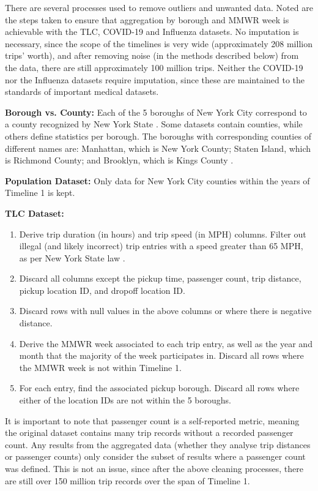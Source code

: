 \documentclass[11pt]{article}
\begin{document}
There are several processes used to remove outliers and unwanted data.
Noted are the steps taken to ensure that aggregation by borough and MMWR week is achievable with the TLC, COVID-19 and Influenza datasets.
No imputation is necessary, since the scope of the timelines is very wide (approximately 208 million trips' worth), 
and after removing noise (in the methods described below) from the data, there are still approximately 100 million trips.
Neither the COVID-19 nor the Influenza datasets require imputation, 
since these are maintained to the standards of important medical datasets.

\textbf{Borough vs. County:} Each of the 5 boroughs of New York City correspond to a county recognized by New York State \cite{countytoborough}.
Some datasets contain counties, while others define statistics per borough. The boroughs with corresponding counties of different names are: 
Manhattan, which is New York County; 
Staten Island, which is Richmond County;
and Brooklyn, which is Kings County \cite{countytoborough}.

\textbf{Population Dataset:}
Only data for New York City counties within the years of Timeline 1 is kept.

\textbf{TLC Dataset:}
\begin{multicols}{2}
    \begin{enumerate}
        \item Derive trip duration (in hours) and trip speed (in MPH) columns. 
        Filter out illegal (and likely incorrect) trip entries with a speed greater than 65 MPH, 
        as per New York State law \cite{laws}.
        \item Discard all columns except the pickup time, passenger count, trip distance, pickup location ID, and dropoff location ID.
        \item Discard rows with null values in the above columns or where there is negative distance.
        \item Derive the MMWR week associated to each trip entry, as well as the year and month that the majority of the week participates in.
        Discard all rows where the MMWR week is not within Timeline 1.
        \item For each entry, find the associated pickup borough. 
        Discard all rows where either of the location IDs are not within the 5 boroughs.
    \end{enumerate}
\end{multicols}
It is important to note that passenger count is a self-reported metric, 
meaning the original dataset contains many trip records without a recorded passenger count.
Any results from the aggregated data (whether they analyse trip distances or passenger counts) 
only consider the subset of results where a passenger count was defined.
This is not an issue, since after the above cleaning processes,
there are still over 150 million trip records over the span of Timeline 1.
\end{document}
